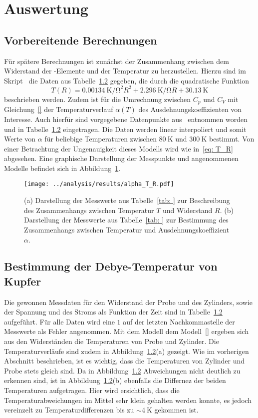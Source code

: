 \section{Auswertung}



\subsection{Vorbereitende Berechnungen}
Für spätere Berechnungen ist zunächst der Zusammenhang zwischen dem Widerstand der -Elemente und der Temperatur 
zu herzustellen. Hierzu sind im Skript~\cite{anleitung47} die Daten aus Tabelle~\ref{} gegeben, die durch die quadratische 
Funktion
\begin{equation}
    T(R) = \SI{0.00134}{\kelvin \per \ohm\squared} R^2 + \SI{2.296}{\kelvin \per \ohm} R + \SI{30.13}{\kelvin}
    \label{eq: T_R}
\end{equation}
beschrieben werden. Zudem ist für die Umrechnung zwischen $C_p$ und $C_V$ mit Gleichung~\eqref{} der Temperaturverlauf 
$\alpha(T)$ des Ausdehnungskoeffizienten von Interesse. Auch hierfür sind vorgegebene Datenpunkte aus~\cite{} entnommen 
worden und in Tabelle~\ref{} eingetragen. Die Daten werden linear interpoliert und somit Werte von $\alpha$ für 
beliebige Temperaturen zwischen $\SI{80}{\kelvin}$ und $\SI{300}{\kelvin}$ bestimmt. Von einer Betrachtung der Ungenauigkeit 
dieses Modells wird wie in~\eqref{eq: T_R} abgesehen. Eine graphische Darstellung der Messpunkte und angenommenen 
Modelle befindet sich in Abbildung~\ref{fig: alpha_T_R}.
\begin{figure}
\centering
\texttt{[image: ../analysis/results/alpha\_T\_R.pdf]}
\caption{(a) Darstellung der Messwerte aus Tabelle~\ref{tab: } zur Beschreibung des Zusammenhangs zwischen Temperatur 
        $T$ und Widerstand $R$.
        (b) Darstellung der Messwerte aus Tabelle~\ref{tab: } zur Bestimmung des Zusammenhangs zwischen Temperatur und
         Ausdehnungskoeffizient $\alpha$.}
\label{fig: alpha_T_R}
\end{figure}


\subsection{Bestimmung der Debye-Temperatur von Kupfer}
Die gewonnen Messdaten für den Widerstand der Probe und des Zylinders, sowie der Spannung und des Stroms
als Funktion der Zeit sind in Tabelle~\ref{} aufgeführt. Für alle Daten wird eine $1$ auf der letzten
Nachkommastelle der Messwerte als Fehler angenommen. 
Mit dem Modell dem Modell~\eqref{} ergeben sich aus den Widerständen die Temperaturen von Probe und Zylinder.
Die Temperaturverläufe sind zudem in Abbildung~\ref{}(a) gezeigt. Wie im vorherigen Abschnitt beschrieben, ist es 
wichtig, dass die Temperaturen von Zylinder und Probe stets gleich sind. Da in Abbildung~\ref{} Abweichungen nicht 
deutlich zu erkennen sind, ist in Abbildung~\ref{}(b) ebenfalls die Differnez der beiden Temperaturen 
aufgetragen. Hier wird ersichtlich, dass die Temperaturabweichungen im Mittel sehr klein gehalten werden konnte, es
jedoch vereinzelt zu Temperaturdifferenzen bis zu $\sim\!\SI{4}{\kelvin}$ gekommen ist.

